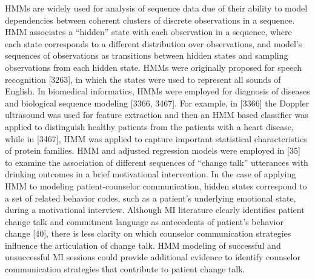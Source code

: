 HMMs are widely used for analysis of sequence data due of their ability to model dependencies between coherent clusters of discrete observations in a sequence. HMM associates a “hidden” state with each observation in a sequence, where each state corresponds to a different distribution over observations, and model’s sequences of observations as transitions between hidden states and sampling observations from each hidden state. HMMs were originally proposed for speech recognition [3263], in which the states were used to represent all sounds of English. In biomedical informatics, HMMs were employed for diagnosis of diseases and biological sequence modeling [3366, 3467]. For example, in [3366] the Doppler ultrasound was used for feature extraction and then an HMM based classifier was applied to distinguish healthy patients from the patients with a heart disease, while in [3467], HMM was applied to capture important statistical characteristics of protein families. HMM and adjusted regression models were employed in [35] to examine the association of different sequences of “change talk” utterances with drinking outcomes in a brief motivational intervention.  In the case of applying HMM to modeling patient-counselor communication, hidden states correspond to a set of related behavior codes, such as a patient’s underlying emotional state, during a motivational interview. Although MI literature clearly identifies patient change talk and commitment language as antecedents of patient’s behavior change [40], there is less clarity on which counselor communication strategies influence the articulation of change talk. HMM modeling of successful and unsuccessful MI sessions could provide additional evidence to identify counselor communication strategies that contribute to patient change talk.

